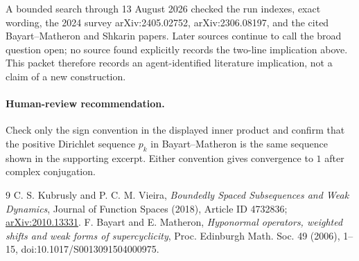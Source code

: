 \documentclass[10pt]{article}
\begin{document}
A bounded search through 13 August 2026 checked the run indexes, exact wording,
the 2024 survey arXiv:2405.02752, arXiv:2306.08197, and the cited
Bayart--Matheron and Shkarin papers.  Later sources continue to call the broad
question open; no source found explicitly records the two-line implication
above.  This packet therefore records an agent-identified literature
implication, not a claim of a new construction.

\paragraph{Human-review recommendation.}
Check only the sign convention in the displayed inner product and confirm that
the positive Dirichlet sequence $p_k$ in Bayart--Matheron is the same sequence
shown in the supporting excerpt.  Either convention gives convergence to
$1$ after complex conjugation.

\begin{thebibliography}{9}
C. S. Kubrusly and P. C. M. Vieira,
\emph{Boundedly Spaced Subsequences and Weak Dynamics},
Journal of Function Spaces (2018), Article ID 4732836;
\href{https://arxiv.org/abs/2010.13331}{arXiv:2010.13331}.
F. Bayart and E. Matheron,
\emph{Hyponormal operators, weighted shifts and weak forms of
supercyclicity}, Proc. Edinburgh Math. Soc. 49 (2006), 1--15,
doi:10.1017/S0013091504000975.
\end{thebibliography}
\end{document}
